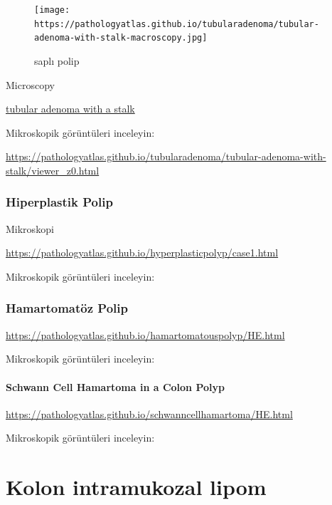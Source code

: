 \documentclass[
  letterpaper,
  DIV=11,
  numbers=noendperiod]{scrreprt}
\begin{document}
\begin{figure}

{\centering \texttt{[image: https://pathologyatlas.github.io/tubularadenoma/tubular-adenoma-with-stalk-macroscopy.jpg]}

}

\caption{saplı polip}

\end{figure}

Microscopy

\href{https://pathologyatlas.github.io/tubularadenoma/tubular-adenoma-with-stalk.jpeg}{tubular
adenoma with a stalk}

Mikroskopik görüntüleri inceleyin:

\url{https://pathologyatlas.github.io/tubularadenoma/tubular-adenoma-with-stalk/viewer_z0.html}

\hypertarget{hiperplastik-polip}{%
\subsection{Hiperplastik Polip}\label{hiperplastik-polip}}

Mikroskopi

\url{https://pathologyatlas.github.io/hyperplasticpolyp/case1.html}

Mikroskopik görüntüleri inceleyin:

\hypertarget{hamartomatuxf6z-polip-1}{%
\subsection{Hamartomatöz Polip}\label{hamartomatuxf6z-polip-1}}

\url{https://pathologyatlas.github.io/hamartomatouspolyp/HE.html}

Mikroskopik görüntüleri inceleyin:

\hypertarget{schwann-cell-hamartoma-in-a-colon-polyp-1}{%
\subsubsection{Schwann Cell Hamartoma in a Colon
Polyp}\label{schwann-cell-hamartoma-in-a-colon-polyp-1}}

\url{https://pathologyatlas.github.io/schwanncellhamartoma/HE.html}

Mikroskopik görüntüleri inceleyin:

\hypertarget{kolon-intramukozal-lipom}{%
\chapter{Kolon intramukozal lipom}\label{kolon-intramukozal-lipom}}
\end{document}

